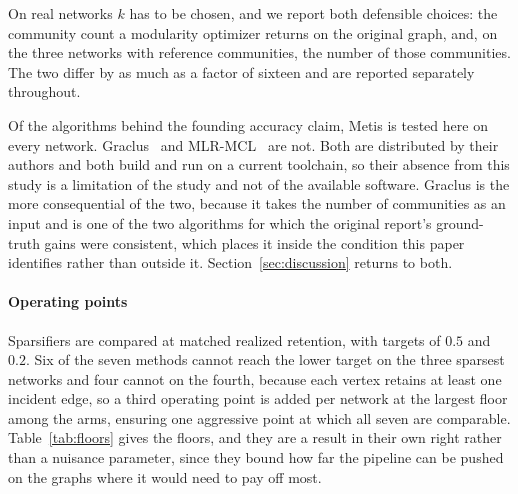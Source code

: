 On real networks $k$ has to be chosen, and we report both defensible choices: the
community count a modularity optimizer returns on the original graph, and, on the
three networks with reference communities, the number of those communities. The
two differ by as much as a factor of sixteen and are reported separately
throughout.

Of the algorithms behind the founding accuracy claim, Metis is tested here on
every network. Graclus~\cite{dhillon2007weighted} and
MLR-MCL~\cite{satuluri2009scalable} are not. Both are distributed by their
authors and both build and run on a current toolchain, so their absence from this
study is a limitation of the study and not of the available software. Graclus is
the more consequential of the two, because it takes the number of communities as
an input and is one of the two algorithms for which the original report's
ground-truth gains were consistent, which places it inside the condition this
paper identifies rather than outside it.
Section~\ref{sec:discussion} returns to both.

\paragraph{Operating points}
Sparsifiers are compared at matched realized retention, with targets of $0.5$ and
$0.2$. Six of the seven methods cannot reach the lower target on the three
sparsest networks and four cannot on the fourth,
because each vertex retains at least one incident edge, so a third operating
point is added per network at the largest floor among the arms, ensuring one
aggressive point at which all seven are comparable. Table~\ref{tab:floors} gives
the floors, and they are a result in their own right rather than a nuisance
parameter, since they bound how far the pipeline can be pushed on the graphs
where it would need to pay off most.

